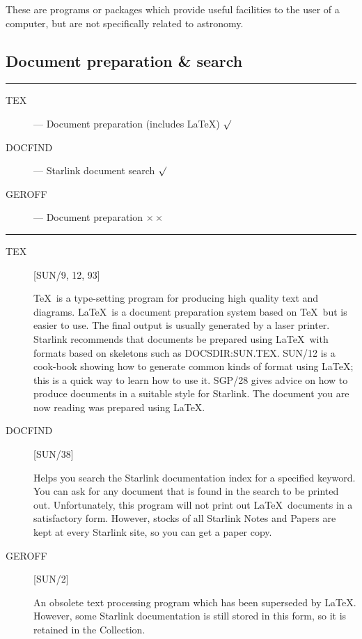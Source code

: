 These are programs or packages which provide useful facilities to the user
of a computer, but are not specifically related to astronomy.

\subsection{Document preparation \& search}

\rule{\textwidth}{0.5mm}
\begin{description}
\begin{description}
\item [TEX] --- Document preparation (includes \LaTeX) \hfill $\surd$
\item [DOCFIND] --- Starlink document search \hfill $\surd$
\item [GEROFF] --- Document preparation \hfill $\times\times$
\end{description}
\end{description}
\rule{\textwidth}{0.5mm}

\begin{description}

\item [TEX] \hfill [SUN/9, 12, 93]

\TeX\ is a type-setting program for producing high quality text and diagrams.
\LaTeX\ is a document preparation system based on \TeX\ but is easier to use.
The final output is usually generated by a laser printer.
Starlink recommends that documents be prepared using \LaTeX\ with formats based
on skeletons such as DOCSDIR:SUN.TEX.
SUN/12 is a cook-book showing how to generate common kinds of format using
\LaTeX; this is a quick way to learn how to use it.
SGP/28 gives advice on how to produce documents in a suitable style for
Starlink.
The document you are now reading was prepared using \LaTeX.

\item [DOCFIND] \hfill [SUN/38]

Helps you search the Starlink documentation index for a specified keyword.
You can ask for any document that is found in the search to be printed out.
Unfortunately, this program will not print out \LaTeX\ documents in a
satisfactory form.
However, stocks of all Starlink Notes and Papers are kept at every Starlink
site, so you can get a paper copy.

\item [GEROFF] \hfill [SUN/2]

An obsolete text processing program which has been superseded by \LaTeX.
However, some Starlink documentation is still stored in this form, so it is
retained in the Collection.

\end{description}

